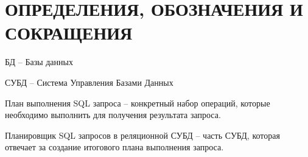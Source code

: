 \section*{ОПРЕДЕЛЕНИЯ, ОБОЗНАЧЕНИЯ И СОКРАЩЕНИЯ}
БД -- Базы данных

СУБД -- Система Управления Базами Данных

План выполнения SQL запроса -- конкретный набор операций, которые необходимо выполнить для получения результата запроса.

Планировщик SQL запросов в реляционной СУБД -- часть СУБД, которая отвечает за создание итогового плана выполнения запроса.